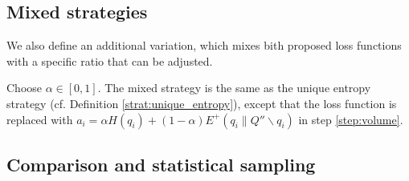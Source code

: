 


\subsection{Mixed strategies}

We also define an additional variation, which mixes bith proposed loss functions with a specific ratio that can be adjusted.

\begin{definition} \label{strat:mixed}
    Choose $\alpha \in [0, 1]$. The mixed strategy is the same as the unique entropy strategy (cf. Definition \ref{strat:unique_entropy}), except that the loss function is replaced with $a_i = \alpha H(q_i) + (1 - \alpha) E^+(q_i \parallel Q'' \backslash q_i)$ in step \ref{step:volume}.
\end{definition}



\subsection{Comparison and statistical sampling}

